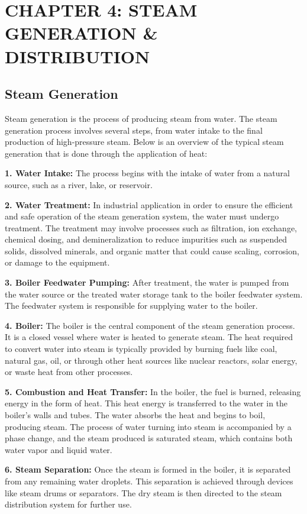 \section{CHAPTER 4: STEAM GENERATION \& DISTRIBUTION}
\subsection{Steam Generation}
Steam generation is the process of producing steam from water. The steam generation process involves several steps, from water intake to the final production of high-pressure steam. Below is an overview of the typical steam generation that is done through the application of heat:

\textbf{1. Water Intake:} The process begins with the intake of water from a natural source, such as a river, lake, or reservoir. 

\textbf{2. Water Treatment:} In industrial application in order to ensure the efficient and safe operation of the steam generation system, the water must undergo treatment. The treatment may involve processes such as filtration, ion exchange, chemical dosing, and demineralization to reduce impurities such as suspended solids, dissolved minerals, and organic matter that could cause scaling, corrosion, or damage to the equipment.

\textbf{3. Boiler Feedwater Pumping:} After treatment, the water is pumped from the water source or the treated water storage tank to the boiler feedwater system. The feedwater system is responsible for supplying water to the boiler.

\textbf{4. Boiler:} The boiler is the central component of the steam generation process. It is a closed vessel where water is heated to generate steam. The heat required to convert water into steam is typically provided by burning fuels like coal, natural gas, oil, or through other heat sources like nuclear reactors, solar energy, or waste heat from other processes.

\textbf{5. Combustion and Heat Transfer:} In the boiler, the fuel is burned, releasing energy in the form of heat. This heat energy is transferred to the water in the boiler's walls and tubes. The water absorbs the heat and begins to boil, producing steam. The process of water turning into steam is accompanied by a phase change, and the steam produced is saturated steam, which contains both water vapor and liquid water.

\textbf{6. Steam Separation:} Once the steam is formed in the boiler, it is separated from any remaining water droplets. This separation is achieved through devices like steam drums or separators. The dry steam is then directed to the steam distribution system for further use.

